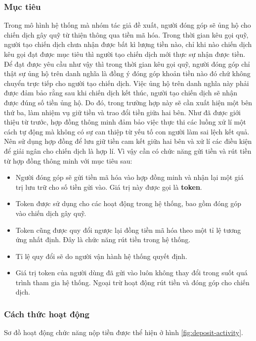 \documentclass[../main-report.tex]{subfiles}
\begin{document}
\subsubsection{Mục tiêu}
Trong mô hình hệ thống mà nhóm tác giả đề xuất, người đóng góp sẽ ủng hộ cho chiến dịch gây quỹ từ thiện thông qua tiền mã hóa. Trong thời gian kêu gọi quỹ, người tạo chiến dịch chưa nhận được bất kì lượng tiền nào, chỉ khi nào chiến dịch kêu gọi đạt được mục tiêu thì người tạo chiến dịch mới thực sự nhận được tiền. Để đạt được yêu cầu như vậy thì trong thời gian kêu gọi quỹ, người đóng góp chỉ thật sự ủng hộ trên danh nghĩa là đồng ý đóng góp khoản tiền nào đó chứ không chuyển trực tiếp cho người tạo chiến dịch. Việc ủng hộ trên danh nghĩa này phải được đảm bảo rằng sau khi chiến dịch kết thúc, người tạo chiến dịch sẽ nhận được đúng số tiền ủng hộ. Do đó, trong trường hợp này sẽ cần xuất hiện một bên thứ ba, làm nhiệm vụ giữ tiền và trao đổi tiền giữa hai bên. Như đã được giới thiệu từ trước, hợp đồng thông minh đảm bảo việc thực thi các luồng xử lí một cách tự động mà không có sự can thiệp từ yếu tố con người làm sai lệch kết quả. Nên sử dụng hợp đồng để lưu giữ tiền cam kết giữa hai bên và xử lí các điều kiện để giải ngân cho chiến dịch là hợp lí. Vì vậy cần có chức năng gửi tiền và rút tiền từ hợp đồng thông minh với mục tiêu sau:

\begin{itemize}
\item Người đóng góp sẽ gửi tiền mã hóa vào hợp đồng minh và nhận lại một giá trị lưu trữ cho số tiền gửi vào. Giá trị này được gọi là \textbf{token}.
\item Token được sử dụng cho các hoạt động trong hệ thống, bao gồm đóng góp vào chiến dịch gây quỹ.
\item Token cũng được quy đổi ngược lại đồng tiền mã hóa theo một tỉ lệ tương ứng nhất định. Đây là chức năng rút tiền trong hệ thống.
\item Tỉ lệ quy đổi sẽ do người vận hành hệ thống quyết định.
\item Giá trị token của người dùng đã gửi vào luôn không thay đổi trong suốt quá trình tham gia hệ thống. Ngoại trừ hoạt động rút tiền và đóng góp cho chiến dịch.
\end{itemize}

\subsubsection{Cách thức hoạt động}
Sơ đồ hoạt động chức năng nộp tiền được thể hiện ở hình \ref{fig:deposit-activity}.
\end{document}
